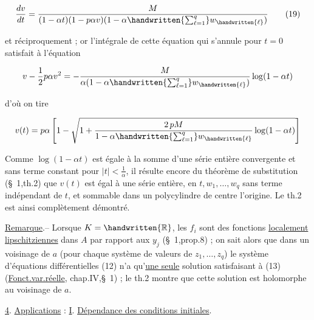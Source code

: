 

\[
\frac{dv}{dt}=\frac{M}{(1-\alpha t)(1-p\alpha v)(1-\alpha\handwritten{\sum_{\ell=1}^{q}}w_{\handwritten{\ell}})}\tag*{(19)}
\]

et réciproquement ; or l'intégrale de cette équation qui s'annule pour
$t=0$ satisfait à l'équation

\[
v-\frac12p\alpha v^2=-\frac{M}{\alpha(1-\alpha\handwritten{\sum_{\ell=1}^{q}}w_{\handwritten{\ell}})}\log(1-\alpha t)
\]

d'où on tire

\[
v(t)=p\alpha\left[1-\sqrt{1+\frac{2\,pM}{1-\alpha\handwritten{\sum_{\ell=1}^{q}}w_{\handwritten{\ell}}}\log(1-\alpha t)}\right]
\]

Comme $\log(1-\alpha t)$ est égale à la somme d'une série entière convergente
et sans terme constant pour $|t|<\frac1{\alpha}$, il résulte encore du théorème de
substitution (\S~1,th.2) que $v(t)$ est égal à une série entière, en
$t,w_1,\ldots,w_q$ sans terme indépendant de $t$, et sommable dans un polycylindre de centre l'origine. Le th.2 est ainsi complètement démontré.

\uline{Remarque}.-- Lorsque $K=\handwritten{\mathbb R}$, les $f_i$ sont des fonctions \uline{localement
lipschitziennes} dans $A$ par rapport aux $y_j$ (\S~1,prop.8) ; on sait
alors que dans un voisinage de $a$ (pour chaque système de valeurs
de $z_1,\ldots,z_q$) le système d'équations différentielles (12) n'a
qu'\uline{une seule} solution satisfaisant à (13) (\uline{Fonct.var.réelle},
chap.IV,\S~1) ; le th.2 montre que cette solution est holomorphe
au voisinage de $a$.

\uline{4}. \uline{Applications} : \uline{I}. \uline{Dépendance des conditions initiales}.

